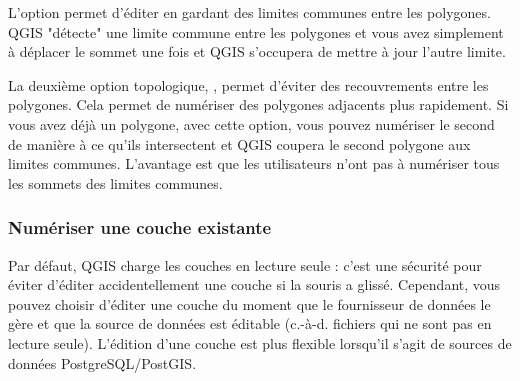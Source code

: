 \begin{itemize}

L'option  permet d'éditer en gardant des limites communes entre les polygones. QGIS "détecte" une limite commune entre les polygones et vous avez simplement à déplacer le sommet une fois et QGIS s'occupera de mettre à jour l'autre limite.


La deuxième option topologique, , permet d'éviter des recouvrements entre les polygones. Cela permet de numériser des polygones adjacents plus rapidement. Si vous avez déjà un polygone, avec cette option, vous pouvez numériser le second de manière à ce qu'ils intersectent et QGIS coupera le second polygone aux limites communes. L'avantage est que les utilisateurs n'ont pas à numériser tous les sommets des limites communes.

\subsubsection{Numériser une couche existante}
\label{sec:edit_existing_layer}

Par défaut, QGIS charge les couches en lecture seule : c'est une sécurité pour éviter d'éditer accidentellement une couche si la souris a glissé. Cependant, vous pouvez choisir d'éditer une couche du moment que le fournisseur de données le gère et que la source de données est éditable (c.-à-d. fichiers qui ne sont pas en lecture seule). 
L'édition d'une couche est plus flexible lorsqu'il s'agit de sources de données PostgreSQL/PostGIS.


\end{itemize}
